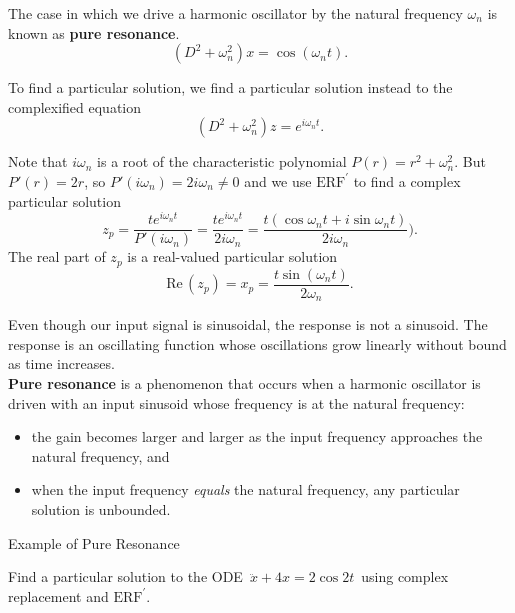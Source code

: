 The case in which we drive a harmonic oscillator by the natural frequency
$\omega _n$ is known as \textbf{\color{blue} pure resonance}.
\begin{equation*}
  (D^2 + \omega _ n^2)x = \cos (\omega _ n t).
\end{equation*}

To find a particular solution, we find a particular solution instead to the complexified equation
\begin{equation*}
  (D^2 + \omega _ n^2)z = e^{i \omega _ n t}.
\end{equation*}

Note that $i \omega _n$ is a root of the characteristic polynomial
$P(r) = r^2 + \omega _ n^2$. But $P'(r) = 2r$, so
$P'(i\omega _ n) = 2i \omega _ n \neq 0$ and we use $\text{ERF}^{\prime}$
to find a complex particular solution
\begin{equation*}
  z_ p = \frac{te^{i\omega _ n t}}{P'(i \omega _ n)}
  = \frac{te^{i\omega _ n t}}{2 i \omega _ n}
  = \frac{t(\cos \omega _ n t + i\sin \omega _ n t)}{2 i \omega _ n}).
\end{equation*}
The real part of $z_ p$ is a real-valued particular solution
\begin{equation*}
  \mathrm{Re\, }(z_ p)=x_ p = \frac{t\sin (\omega _ n t)}{2\omega _ n}.
\end{equation*}

Even though our input signal is sinusoidal, the response is not a sinusoid.
The response is an oscillating function whose oscillations grow linearly
without bound as time increases.\\

\textbf{\color{blue}Pure resonance} is a phenomenon that occurs
when a harmonic oscillator is driven
with an input sinusoid whose frequency is at the natural frequency:

\begin{itemize}
\item the gain becomes larger and larger as
  the input frequency approaches the natural frequency, and
\item when the input frequency \textit{equals} the natural frequency,
  any particular solution is unbounded.
\end{itemize}

\begin{exercise}
  Example of Pure Resonance
\end{exercise}

Find a particular solution to the ODE
$\,  \ddot x + 4 x = 2 \cos 2 t \,$ using complex replacement and
$\text{ERF}^{\prime}$.\\


